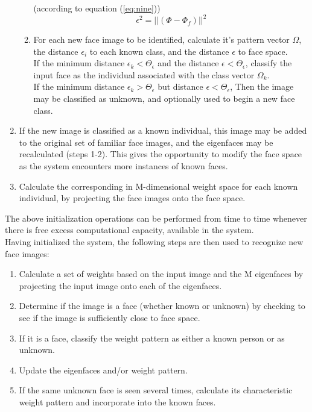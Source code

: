 \begin{enumerate}
\begin{enumerate}
                (according to equation (\ref{eq:nine})) \\
                \begin{equation} \label{eq:nine}
                  \epsilon^{2} = || (\Phi - \Phi_{f}) ||^{2}
                \end{equation}
          \item For each new face image to be identified, calculate it's pattern
                vector $ \Omega $, the distance $ \epsilon_{i} $ to each known
                class, and the distance $ \epsilon $ to face space. \\
                If the minimum distance $ \epsilon_{k} < \Theta_{\epsilon} $
                and the distance $ \epsilon < \Theta_{\epsilon} $, classify the
                input face as the individual associated with the class vector
                $ \Omega_{k} $. \\
                If the minimum distance $ \epsilon_{k} > \Theta_{\epsilon} $ but
                distance $ \epsilon < \Theta_{\epsilon} $, Then the image may be
                classified as unknown, and optionally used to begin a new face class.
        \end{enumerate}
  \item If the new image is classified as a known individual, this image may be added
        to the original set of familiar face images, and the eigenfaces may be recalculated
        (steps 1-2). This gives the opportunity to modify the face space as the
        system encounters more instances of known faces.
  \item Calculate the corresponding in M-dimensional weight space for each known
        individual, by projecting the face images onto the face space.
\end{enumerate}
The above initialization operations can be performed from time to time whenever
there is free excess computational capacity, available in the system. \\
Having initialized the system, the following steps are then used to recognize
new face images: \\
\begin{enumerate}
  \item Calculate a set of weights based on the input image and the M eigenfaces
        by projecting the input image onto each of the eigenfaces.
  \item Determine if the image is a face (whether known or unknown) by checking
        to see if the image is sufficiently close to face space.
  \item If it is a face, classify the weight pattern as either a known person or
        as unknown.
  \item Update the eigenfaces and/or weight pattern.
  \item If the same unknown face is seen several times, calculate its characteristic
        weight pattern and incorporate into the known faces.
\end{enumerate}

